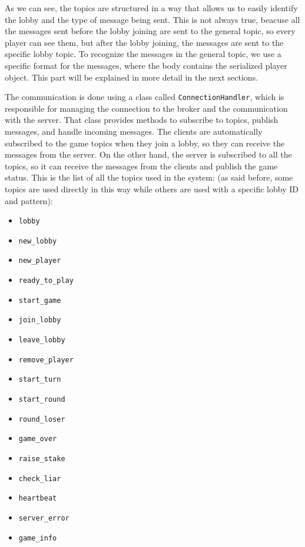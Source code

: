 \documentclass{scrartcl}
\begin{document}
As we can see, the topics are structured in a way that allows us to easily identify the lobby and the type of message being sent. This is not always true, beacuse all the messages sent before the lobby joining are sent to the general topic, so every player can see them, but after the lobby joining, the messages are sent to the specific lobby topic. \newline
To recognize the messages in the general topic, we use a specific format for the messages, where the body contains the serialized player object. This part will be explained in more detail in the next sections. \newline

The communication is done using a class called \texttt{ConnectionHandler}, which is responsible for managing the connection to the broker and the communication with the server. That class provides methods to subscribe to topics, publish messages, and handle incoming messages. \newline
The clients are automatically subscribed to the game topics when they join a lobby, so they can receive the messages from the server. On the other hand, the server is subscribed to all the topics, so it can receive the messages from the clients and publish the game status. \newline
This is the list of all the topics used in the system: (as said before, some topics are used directly in this way while others are used with a specific lobby ID and pattern):
\begin{itemize}
      \item \texttt{lobby}
      \item \texttt{new\_lobby}
      \item \texttt{new\_player}
      \item \texttt{ready\_to\_play}
      \item \texttt{start\_game}
      \item \texttt{join\_lobby}
      \item \texttt{leave\_lobby}
      \item \texttt{remove\_player}
      \item \texttt{start\_turn}
      \item \texttt{start\_round}
      \item \texttt{round\_loser}
      \item \texttt{game\_over}
      \item \texttt{raise\_stake}
      \item \texttt{check\_liar}
      \item \texttt{heartbeat}
      \item \texttt{server\_error}
      \item \texttt{game\_info}
\end{itemize}
\end{document}
